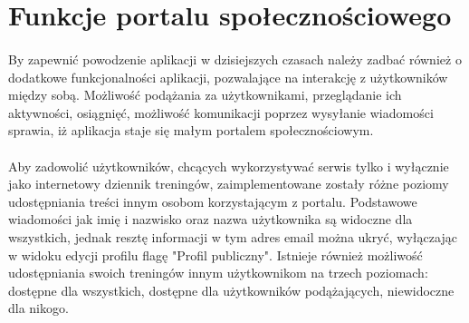 \newpage
\section{Funkcje portalu społecznościowego} %
\label{sec:profil_u_ytkownika}
\paragraph{} %
\label{par:}
By zapewnić powodzenie aplikacji w dzisiejszych czasach należy zadbać również o dodatkowe funkcjonalności aplikacji, pozwalające na interakcję z użytkowników między sobą. Możliwość podążania za użytkownikami, przeglądanie ich aktywności, osiągnięć, możliwość komunikacji poprzez wysyłanie wiadomości sprawia, iż aplikacja staje się małym portalem społecznościowym. 
\paragraph{} %
\label{par:}

Aby zadowolić użytkowników, chcących wykorzystywać serwis tylko i wyłącznie jako internetowy dziennik treningów, zaimplementowane zostały różne poziomy udostępniania treści innym osobom korzystającym z portalu. Podstawowe wiadomości jak imię i nazwisko oraz nazwa użytkownika są widoczne dla wszystkich, jednak resztę informacji w tym adres email można ukryć, wyłączając w widoku edycji profilu flagę "Profil publiczny". Istnieje również możliwość udostępniania swoich treningów innym użytkownikom na trzech poziomach: dostępne dla wszystkich, dostępne dla użytkowników podążających, niewidoczne dla nikogo.


